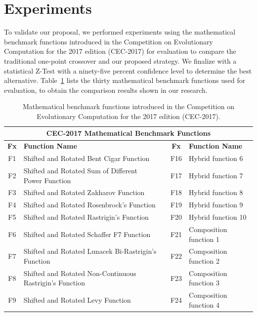 \documentclass[graybox]{svmult}
\begin{document}
\section{Experiments}
    \label{section.experiments}

    To validate our proposal, we performed experiments using the mathematical benchmark functions introduced in the Competition on Evolutionary Computation for the 2017 edition (CEC-2017) for evaluation to compare the traditional one-point crossover and our proposed strategy. We finalize with a statistical Z-Test with a ninety-five percent confidence level to determine the best alternative. Table~\ref{tab.benchmark_functions} lists the thirty mathematical benchmark functions used for evaluation, to obtain the comparison results shown in our research.

    \begin{table}[]
    \scriptsize
    \centering
    \caption{Mathematical benchmark functions introduced in the Competition on Evolutionary Computation for the 2017 edition (CEC-2017).}\label{tab.benchmark_functions}    
    \begin{tabular}{@{}cllcl@{}}
    \toprule
    \multicolumn{5}{c}{\textbf{CEC-2017 Mathematical Benchmark Functions}} \\ \midrule
    \textbf{Fx} & \textbf{Function Name} &  & \textbf{Fx} & \textbf{Function Name} \\
    F1 & Shifted and Rotated   Bent Cigar Function &  & F16 & Hybrid function 6 \\
    F2 & Shifted and Rotated   Sum of Different Power Function &  & F17 & Hybrid function 7 \\
    F3 & Shifted and Rotated   Zakharov Function &  & F18 & Hybrid function 8 \\
    F4 & Shifted and Rotated   Rosenbrock's Function &  & F19 & Hybrid function 9 \\
    F5 & Shifted and Rotated   Rastrigin's Function &  & F20 & Hybrid function 10 \\
    F6 & Shifted and Rotated   Schaffer F7 Function &  & F21 & Composition function   1 \\
    F7 & Shifted and Rotated   Lunacek Bi-Rastrigin's Function &  & F22 & Composition function   2 \\
    F8 & Shifted and Rotated   Non-Continuous Rastrigin's Function &  & F23 & Composition function   3 \\
    F9 & Shifted and Rotated   Levy Function &  & F24 & Composition function   4 \\

\end{tabular}
\end{table}
\end{document}

